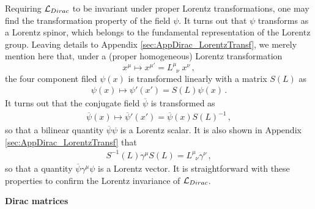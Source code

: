 Requiring ${\cal L}_{Dirac}$ to be invariant under proper Lorentz transformations,
one may find the transformation property of the field $\psi$.
It turns out that $\psi$ transforms as a Lorentz spinor, which 
belongs to the fundamental representation of the Lorentz group.
Leaving details to Appendix \ref{sec:AppDirac_LorentzTransf},
we merely mention here that, under a (proper homogeneous) Lorentz transformation 
\begin{equation}
x^\mu \mapsto x^{\mu'} = L^\mu_{\;\;\nu}\; x^\nu\,,
\end{equation}
the four component filed $\psi(x)$ is transformed linearly 
with a matrix $S(L)$ as
\begin{eqnarray}
\psi(x)
\mapsto
\psi'(x') 
= 
S(L) \psi(x)\,.
\end{eqnarray}
It turns out that the conjugate field $\overline{\psi}$
is transformed as
\begin{eqnarray}
\overline{\psi}(x)
\mapsto
\overline{\psi}'(x')
= 
\overline{\psi}(x) S(L)^{-1}\,,
\end{eqnarray}
so that a bilinear quantity $\overline{\psi} \psi$ is a Lorentz scalar.
It is also shown in Appendix \ref{sec:AppDirac_LorentzTransf} that
\begin{eqnarray}
S^{-1}(L) \gamma^\mu S(L) = L^\mu_{\;\;\nu} \gamma^\nu \,,
\label{eqn:LorentzTransfgamma}
\end{eqnarray}
so that a quantity $\overline{\psi} \gamma^\mu \psi$ is a Lorentz vector.
It is straightforward with these properties to confirm the Lorentz invariance of ${\cal L}_{Dirac}$.


\bigskip
\noindent
{\bf Dirac matrices}

